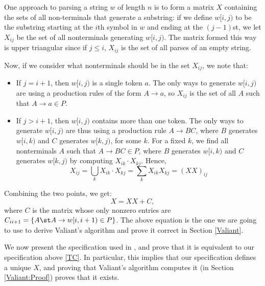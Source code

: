 One approach to parsing a string $w$ of length $n$ is to form a matrix $X$ containing the sets of all non-terminals that generate a substring: if we define $w[i,j)$ to be the substring starting at the $i$th symbol in $w$ and ending at the $(j-1)$st, we let $X_{i j}$ be the set of all nonterminals generating $w[i,j)$. The matrix formed this way is upper triangular since if $j \le i$, $X_{i j}$ is the set of all parses of an empty string.

Now, if we consider what nonterminals should be in the set $X_{i j}$, we note that:
\begin{itemize}
\item If $j = i + 1$, then $w[i,j)$ is a single token $a$. The only ways to generate $w[i,j)$ are using a production rules of the form $A \to a$, so $X_{i j}$ is the set of all $A$ such that $A \to a \in P$.
\item If $j > i + 1$, then $w[i,j)$ contains more than one token. The only ways to generate $w[i,j)$ are thus using a production rule $A \to BC$, where $B$ generates $w[i,k)$ and $C$ generates $w[k,j)$, for some $k$. For a fixed $k$, we find all nonterminals $A$ such that $A \to BC \in P$, where $B$ generates $w[i,k)$ and $C$ generates $w[k,j)$ by computing $X_{i k} \cdot X_{k j}$. Hence, 
            \begin{equation}
              X_{i j} = \bigcup_k X_{i k}\cdot X_{k j} = \sum_kX_{i k}X_{k j} = (XX)_{i j}
            \end{equation}
\end{itemize}
Combining the two points, we get:
\begin{equation}
  \label{TC}
  X = XX + C,
\end{equation}
where $C$ is the matrix whose only nonzero entries are $C_{i i+1} = \{A \st A \to w[i,i+1) \in P\}$. The above equation is the one we are going to use to derive Valiant's algorithm and prove it correct in Section \ref{Valiant}. 




\label{Valiant's-spec}
We now present the specification used in \citep{Valiant}, and prove that it is equivalent to our specification above \eqref{TC}. In particular, this implies that our specification defines a unique $X$, and proving that Valiant's algorithm computes it (in Section \ref{Valiant:Proof}) proves that it exists.

